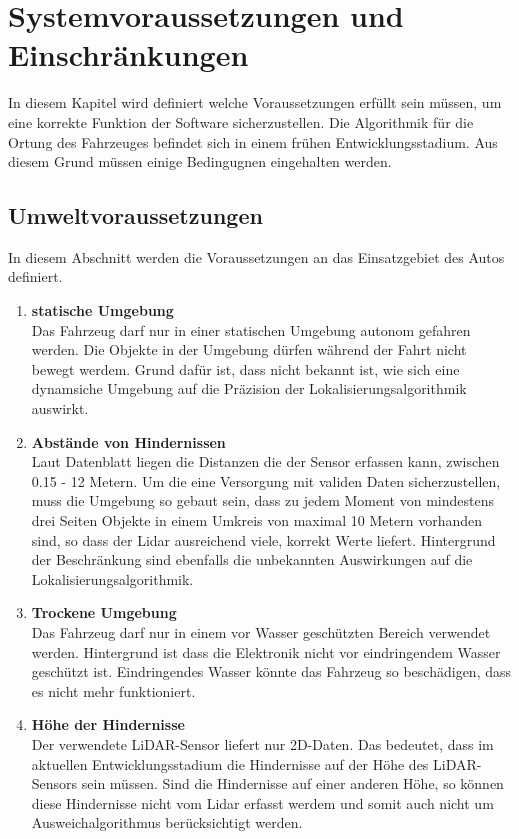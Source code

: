 \section{Systemvoraussetzungen und Ein\-schränkungen}
In diesem Kapitel wird definiert welche Voraussetzungen erfüllt sein müssen, um eine korrekte Funktion der Software sicherzustellen.
Die Algorithmik für die Ortung des Fahrzeuges befindet sich in einem frühen Entwicklungsstadium. 
Aus diesem Grund müssen einige Bedingugnen eingehalten werden. 
\subsection{Umweltvoraussetzungen}
In diesem Abschnitt werden die Voraussetzungen an das Einsatzgebiet des Autos definiert.
\begin{enumerate}[leftmargin=*]
    \item \textbf{statische Umgebung} \\
    Das Fahrzeug darf nur in einer statischen Umgebung autonom gefahren werden. 
    Die Objekte in der Umgebung dürfen während der Fahrt nicht bewegt werdem.
    Grund dafür ist, dass nicht bekannt ist, wie sich eine dynamsiche Umgebung auf die Präzision der Lokalisierungsalgorithmik auswirkt. 
    \item \textbf{Abstände von Hindernissen}\\
    Laut Datenblatt \cite{Slamtec2020} liegen die Distanzen die der Sensor erfassen kann, zwischen 0.15 - 12 Metern.
    Um die eine Versorgung mit validen Daten sicherzustellen, 
    muss die Umgebung so gebaut sein, 
    dass zu jedem Moment von mindestens drei Seiten Objekte in einem Umkreis von maximal 10 Metern vorhanden sind,
    so dass der Lidar ausreichend viele, korrekt Werte liefert.  
    Hintergrund der Beschränkung sind ebenfalls die unbekannten Auswirkungen auf die Lokalisierungsalgorithmik.
    \item \textbf{Trockene Umgebung}\\
    Das Fahrzeug darf nur in einem vor Wasser geschützten Bereich verwendet werden.
    Hintergrund ist dass die Elektronik nicht vor eindringendem Wasser geschützt ist.
    Eindringendes Wasser könnte das Fahrzeug so beschädigen, dass es nicht mehr funktioniert.
    \item \textbf{Höhe der Hindernisse}\\
    Der verwendete LiDAR-Sensor liefert nur 2D-Daten. 
    Das bedeutet, dass im aktuellen Entwicklungsstadium die Hindernisse auf der Höhe des LiDAR-Sensors sein müssen.
    Sind die Hindernisse auf einer anderen Höhe, so können diese Hindernisse nicht vom Lidar erfasst werdem 
    und somit auch nicht um Ausweichalgorithmus berücksichtigt werden.
\end{enumerate}



